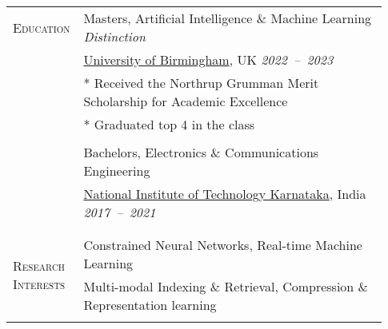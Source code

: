\documentclass[letterpaper, 10pt, oneside]{article}
\newcommand{\stitle}[1]{\normalsize{\textsc{#1}}}
\begin{document}
\begin{longtable}{@{} p{0.13\linewidth} p{0.8\linewidth}}
    \stitle{Education}                                & {Masters, Artificial Intelligence \& Machine Learning}  \hfill \textsl{Distinction}                                                                                                                                     \\
                                                      & \href{https://birmingham.ac.uk}{University of Birmingham}, UK \hfill \textsl{2022\ --\ 2023}                                                                                                          \\
                                                      & * Received the Northrup Grumman Merit Scholarship for Academic Excellence \\
                                                      & * Graduated top 4 in the class \\
    \\[-1.5ex]
                                                      & {Bachelors, Electronics \& Communications Engineering}                                                                                                                                   \\
                                                      & \href{https://nitk.ac.in}{National Institute of Technology Karnataka}, India \hfill \hspace{-3em} \textsl{2017\ --\ 2021}                                                                             \\
    \\[-1.5ex]
    \\

    \multirow{2}{5em}{\stitle{Research Interests}}    & Constrained Neural Networks, Real-time Machine Learning                                                                                                                                                             \\
                                                      & Multi-modal Indexing \& Retrieval, Compression \& Representation learning
    \\
    \\



\end{longtable}
\end{document}
